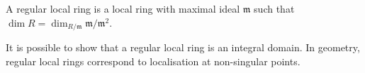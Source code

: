 A regular local ring is a local ring with maximal ideal $\mathfrak{m}$ such that
$\dim R = \dim_{R/\mathfrak{m}} \mathfrak{m}/\mathfrak{m}^2$.

It is possible to show that a regular local ring is an integral domain. In geometry,
regular local rings correspond to localisation at non-singular points.
